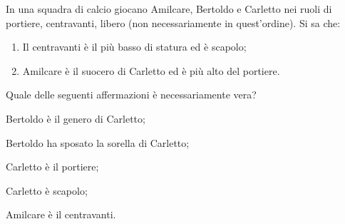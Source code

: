 \begin{esercizio}
\label{ese:0.31}
In una squadra di calcio giocano Amilcare, Bertoldo e Carletto nei ruoli di portiere, centravanti, libero (non necessariamente in quest'ordine). Si sa che:
\begin{enumerate}
\item Il centravanti è il più basso di statura ed è scapolo;
\item Amilcare è il suocero di Carletto ed è più alto del portiere.
\end{enumerate}
Quale delle seguenti affermazioni è necessariamente vera?
\begin{multicols}{2}
\begin{enumeratea}
\item Bertoldo è il genero di Carletto;
\item Bertoldo ha sposato la sorella di Carletto;
\item Carletto è il portiere;
\item Carletto è scapolo;
\item Amilcare è il centravanti.
\end{enumeratea}
\end{multicols}
\end{esercizio}
